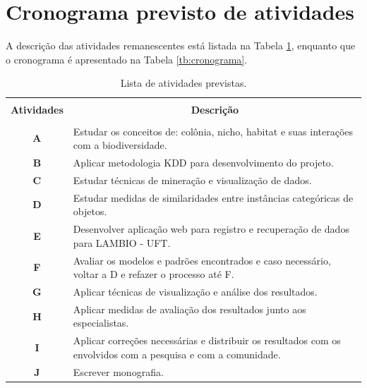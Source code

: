 \documentclass[tcc2,project]{classe_uftex/uftex}
\begin{document}

\section*{Cronograma previsto de atividades}
\label{sec:crono}

\quad A descrição das atividades remanescentes está listada na Tabela \ref{tb:atividades}, enquanto que o cronograma é apresentado na Tabela \ref{tb:cronograma}.


\begin{table}[!h]
  \centering
  \caption{Lista de atividades previstas.}\label{tb:atividades}
  \begin{tabular}{cp{9.4cm}}
    \hline \hline &\\[-0.4cm]
    {\bf Atividades} & \multicolumn{1}{c}{\bf Descrição} \\
    \hline
    &\\[-0.4cm]
    \textbf{A} &  Estudar os conceitos de: colônia, nicho, habitat e suas interações com a biodiversidade. \\[0.2cm]
    \textbf{B} &  Aplicar metodologia KDD para desenvolvimento do projeto.\\[0.2cm]
    \textbf{C} &  Estudar técnicas de mineração e visualização de dados.\\[0.2cm]
    \textbf{D} &  Estudar medidas de similaridades entre instâncias categóricas de objetos. \\[0.2cm]
    \textbf{E} &  Desenvolver aplicação web para registro e recuperação de dados para LAMBIO - UFT. \\[0.2cm]
    \textbf{F} &  Avaliar os modelos e padrões encontrados e caso necessário, voltar a D e refazer o processo até F.\\[0.2cm]
    \textbf{G} &  Aplicar técnicas de visualização e análise dos resultados.\\[0.2cm]
    \textbf{H} &  Aplicar medidas de avaliação dos resultados junto aos especialistas.\\[0.2cm]
    \textbf{I} &  Aplicar correções necessárias e distribuir os resultados com os envolvidos com a pesquisa e com a comunidade.\\[0.2cm]
    \textbf{J} &  Escrever monografia.\\[0.2cm]
    \hline \hline
  \end{tabular}
\end{table}
\end{document}
